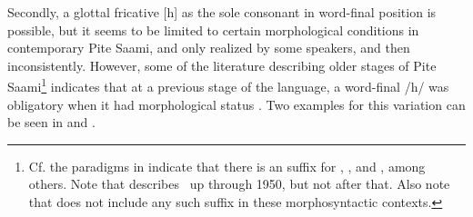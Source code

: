 Secondly, a glottal fricative [h] as the sole consonant in word-final position is possible, but it seems to be limited to certain morphological conditions in contemporary Pite Saami, and only realized by some speakers, and then inconsistently. 
However, some of the literature describing older stages of Pite Saami\footnote{Cf. the paradigms in \citet[150-159]{Lehtiranta1992} indicate that there is an  suffix for , ,  and , among others. Note that \citet{Lehtiranta1992} describes \PS\ up through 1950, but not after that. Also note that \citet[104,120]{Lagercrantz1926} does not include any such suffix in these morphosyntactic contexts.} indicates that at a previous stage of the language, a word-final /h/ was obligatory when it had morphological status%
. Two examples for this variation can be seen in  and .
\ea\label{work2SGPRS}
\z
\ea\label{fishDIMGENSG}
\z



